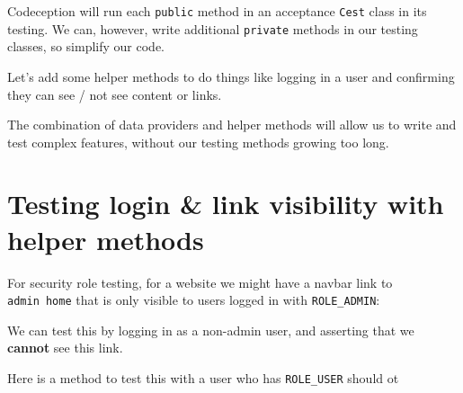 \documentclass[a4paperpaper,openright]{book}
\newenvironment{Shaded}{}{}
\newcommand{\AnnotationTok}[1]{\textcolor[rgb]{0.38,0.63,0.69}{\textbf{\textit{#1}}}}
\newcommand{\CommentTok}[1]{\textcolor[rgb]{0.38,0.63,0.69}{\textit{#1}}}
\newcommand{\CommentVarTok}[1]{\textcolor[rgb]{0.38,0.63,0.69}{\textbf{\textit{#1}}}}
\newcommand{\KeywordTok}[1]{\textcolor[rgb]{0.00,0.44,0.13}{\textbf{#1}}}
\newcommand{\NormalTok}[1]{#1}
\newcommand{\OtherTok}[1]{\textcolor[rgb]{0.00,0.44,0.13}{#1}}
\newcommand{\StringTok}[1]{\textcolor[rgb]{0.25,0.44,0.63}{#1}}
\begin{document}
Codeception will run each \texttt{public} method in an acceptance
\texttt{Cest} class in its testing. We can, however, write additional
\texttt{private} methods in our testing classes, so simplify our code.

Let's add some helper methods to do things like logging in a user and
confirming they can see / not see content or links.

The combination of data providers and helper methods will allow us to
write and test complex features, without our testing methods growing too
long.

\hypertarget{testing-login-link-visibility-with-helper-methods}{%
\section{Testing login \& link visibility with helper
methods}\label{testing-login-link-visibility-with-helper-methods}}

For security role testing, for a website we might have a navbar link to
\texttt{admin\ home} that is only visible to users logged in with
\texttt{ROLE\_ADMIN}:

\begin{Shaded}
\end{Shaded}

We can test this by logging in as a non-admin user, and asserting that
we \textbf{cannot} see this link.

Here is a method to test this with a user who has \texttt{ROLE\_USER}
should ot

\begin{Shaded}
\end{Shaded}
\end{document}
